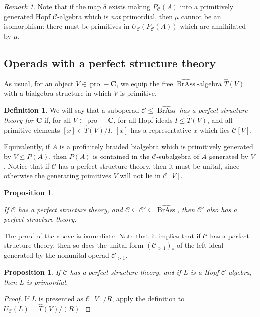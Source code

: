 \documentclass[12pt]{article}
\DeclareMathOperator{\pro}{pro}
\DeclareMathOperator{\BrAss}{BrAss}
\newcommand{\BrAsshat}{\widehat{\BrAss}} %
\newcommand{\That}{\widehat{T}}
\newcommand{\CC} {\mathcal{C}}
\newcommand{\bC} {\mathbf{C}}
\newcommand{\proC}{\pro\!-\bC}
\theoremstyle{plain}
\newtheorem{prop}[thm]{Proposition}
\theoremstyle{definition}
\newtheorem{defn}[thm]{Definition}
\theoremstyle{remark}
\newtheorem{rem}[thm]{Remark}
\begin{document}
\begin{rem} Note that if the map $\delta$ exists making $P_{\CC}(A)$ into a primitively generated Hopf $\CC$-algebra which is \emph{not} primordial, then $\mu$ cannot be an isomorphism: there must be primitives in $U_{\CC}(P_{\CC}(A))$ which are annihilated by $\mu$. \end{rem}


\subsection{Operads with a perfect structure theory} \label{perfect_section}

As usual, for an object $V \in \proC$, we equip the free $\BrAsshat$-algebra $\That(V)$ with a bialgebra structure in which $V$ is primitive.

\begin{defn} We will say that a suboperad $\CC \leq \BrAsshat$ \emph{has a perfect structure theory for $\bC$} if, for all $V \in \proC$, for all Hopf ideals $I \leq \That(V)$, and all primitive elements $[x] \in \That(V)/I$, $[x]$ has a representative $x$ which lies $\CC[V]$. \end{defn} 

Equivalently, if $A$ is a profinitely braided bialgebra which is primitively generated by $V \leq P(A)$, then $P(A)$ is contained in the $\CC$-subalgebra of $A$ generated by $V$.  Notice that if $\CC$ has a perfect structure theory, then it must be unital, since otherwise the generating primitives $V$ will not lie in $\CC[V]$.

\begin{prop} \label{base_change_prop}

If $\CC$ has a perfect structure theory, and $\CC \subseteq \CC' \subseteq \BrAsshat$, then $\CC'$ also has a perfect structure theory.

\end{prop}

The proof of the above is immediate.  Note that it implies that if $\CC$ has a perfect structure theory, then so does the unital form $(\CC_{>1})_*$ of the left ideal generated by the nonunital operad $\CC_{>1}$.

\begin{prop} \label{perfect_primordial_prop} If $\CC$ has a perfect structure theory, and if $L$ is a Hopf $\CC$-algebra, then $L$ is primordial. \end{prop}

\begin{proof} If $L$ is presented as $\CC[V]/R$, apply the definition to $U_{\CC}(L) = \That(V)/(R)$. \end{proof}
\end{document}
